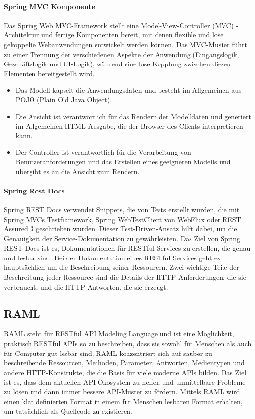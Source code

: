 \paragraph{Spring MVC Komponente}\mbox{}

Das Spring Web MVC-Framework stellt eine Model-View-Controller (MVC) -Architektur und fertige Komponenten bereit, mit denen flexible und lose gekoppelte Webanwendungen entwickelt werden können. Das MVC-Muster führt zu einer Trennung der verschiedenen Aspekte der Anwendung (Eingangslogik, Geschäftslogik und UI-Logik), während eine lose Kopplung zwischen diesen Elementen bereitgestellt wird\cite{tp12mvc}.

\begin{itemize}
	\item Das Modell kapselt die Anwendungsdaten und besteht im Allgemeinen aus POJO (Plain Old Java Object).
	\item Die Ansicht ist verantwortlich für das Rendern der Modelldaten und generiert im Allgemeinen HTML-Ausgabe, die der Browser des Clients interpretieren kann.
	\item Der Controller ist verantwortlich für die Verarbeitung von Benutzeranforderungen und das Erstellen eines geeigneten Modells und übergibt es an die Ansicht zum Rendern.
\end{itemize}

\paragraph{Spring Rest Docs}\mbox{}

Spring REST Docs verwendet Snippets, die von Tests erstellt wurden, die mit Spring MVCs Testframework, Spring WebTestClient von WebFlux oder REST Assured 3 geschrieben wurden. Dieser Test-Driven-Ansatz hilft dabei, um die Genauigkeit der Service-Dokumentation zu gewährleisten. Das Ziel von Spring REST Docs ist es, Dokumentationen für RESTful Services zu erstellen, die genau und lesbar sind. Bei der Dokumentation eines RESTful Services geht es hauptsächlich um die Beschreibung seiner Ressourcen. Zwei wichtige Teile der Beschreibung jeder Ressource sind die Details der HTTP-Anforderungen, die sie verbraucht, und die HTTP-Antworten, die sie erzeugt\cite{srd18wilkinson}.

\subsection{RAML}

RAML steht für RESTful API Modeling Language und ist eine Möglichkeit, praktisch RESTful APIs so zu beschreiben, dass sie sowohl für Menschen als auch für Computer gut lesbar sind. RAML konzentriert sich auf sauber zu beschreibende Ressourcen, Methoden, Parameter, Antworten, Medientypen und andere HTTP-Konstrukte, die die Basis für viele moderne APIs bilden. Das Ziel ist es, dass dem aktuellen API-Ökosystem zu helfen und unmittelbare Probleme zu lösen und dann immer bessere API-Muster zu fördern. Mittels RAML wird einen klar definierten Format in einem für Menschen lesbaren Format erhalten, um tatsächlich als Quellcode zu existieren\cite{raml13def}.

